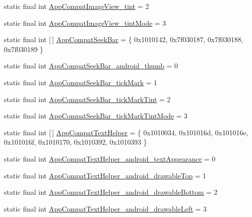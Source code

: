 \begin{DoxyCompactItemize}
static final int \mbox{\hyperlink{classandroid_1_1support_1_1design_1_1_r_1_1styleable_a3f458aca9a85cdb5775e2497efc58a36}{App\+Compat\+Image\+View\+\_\+tint}} = 2
\item 
static final int \mbox{\hyperlink{classandroid_1_1support_1_1design_1_1_r_1_1styleable_a02bf7aab2a5bce4d266cc7cbe606cbef}{App\+Compat\+Image\+View\+\_\+tint\+Mode}} = 3
\item 
static final int \mbox{[}$\,$\mbox{]} \mbox{\hyperlink{classandroid_1_1support_1_1design_1_1_r_1_1styleable_a0b82f9f41bab884666776b93fa48c45d}{App\+Compat\+Seek\+Bar}} = \{ 0x1010142, 0x7f030187, 0x7f030188, 0x7f030189 \}
\item 
static final int \mbox{\hyperlink{classandroid_1_1support_1_1design_1_1_r_1_1styleable_a53b48c25cfd19170a2bcac5f1ba26cd3}{App\+Compat\+Seek\+Bar\+\_\+android\+\_\+thumb}} = 0
\item 
static final int \mbox{\hyperlink{classandroid_1_1support_1_1design_1_1_r_1_1styleable_abfa9ef12874a75eee605e31ef5215253}{App\+Compat\+Seek\+Bar\+\_\+tick\+Mark}} = 1
\item 
static final int \mbox{\hyperlink{classandroid_1_1support_1_1design_1_1_r_1_1styleable_ae8d45777356092f2bda7f9421518d2fb}{App\+Compat\+Seek\+Bar\+\_\+tick\+Mark\+Tint}} = 2
\item 
static final int \mbox{\hyperlink{classandroid_1_1support_1_1design_1_1_r_1_1styleable_a28d6c186a45529a5fc744a63d0e7e453}{App\+Compat\+Seek\+Bar\+\_\+tick\+Mark\+Tint\+Mode}} = 3
\item 
static final int \mbox{[}$\,$\mbox{]} \mbox{\hyperlink{classandroid_1_1support_1_1design_1_1_r_1_1styleable_a1d1ff91d6ee58f549f28fb6643db5d60}{App\+Compat\+Text\+Helper}} = \{ 0x1010034, 0x101016d, 0x101016e, 0x101016f, 0x1010170, 0x1010392, 0x1010393 \}
\item 
static final int \mbox{\hyperlink{classandroid_1_1support_1_1design_1_1_r_1_1styleable_a126c42fd3493b95aa5ee09c6eb327840}{App\+Compat\+Text\+Helper\+\_\+android\+\_\+text\+Appearance}} = 0
\item 
static final int \mbox{\hyperlink{classandroid_1_1support_1_1design_1_1_r_1_1styleable_a2e986baeb1b1471188e668c9241f57fc}{App\+Compat\+Text\+Helper\+\_\+android\+\_\+drawable\+Top}} = 1
\item 
static final int \mbox{\hyperlink{classandroid_1_1support_1_1design_1_1_r_1_1styleable_a6feb8457dde1e62796e1e068697d5131}{App\+Compat\+Text\+Helper\+\_\+android\+\_\+drawable\+Bottom}} = 2
\item 
static final int \mbox{\hyperlink{classandroid_1_1support_1_1design_1_1_r_1_1styleable_a9975608d4bce578013e599668a70a11f}{App\+Compat\+Text\+Helper\+\_\+android\+\_\+drawable\+Left}} = 3

\end{DoxyCompactItemize}
